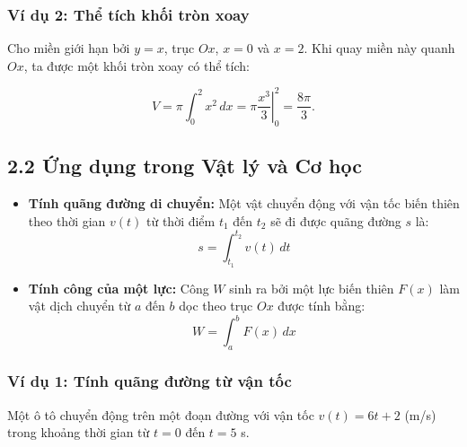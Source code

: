 \documentclass[12pt,a4paper]{article}
\begin{document}
\subsubsection*{Ví dụ 2: Thể tích khối tròn xoay}
Cho miền giới hạn bởi $y=x$, trục $Ox$, $x=0$ và $x=2$. Khi quay miền này quanh $Ox$, ta được một khối tròn xoay có thể tích:

\begin{center}
\end{center}
\[
V=\pi\int_0^2x^2\,dx
=\pi\left.\frac{x^3}{3}\right|_0^2
=\frac{8\pi}{3}.
\]

\subsection{2.2 Ứng dụng trong Vật lý và Cơ học}
\begin{itemize}
    \item \textbf{Tính quãng đường di chuyển:} Một vật chuyển động với vận tốc biến thiên theo thời gian $v(t)$ từ thời điểm $t_1$ đến $t_2$ sẽ đi được quãng đường $s$ là:
    \begin{equation}
    s = \int_{t_1}^{t_2} v(t) \, dt
    \end{equation}
    \item \textbf{Tính công của một lực:} Công $W$ sinh ra bởi một lực biến thiên $F(x)$ làm vật dịch chuyển từ $a$ đến $b$ dọc theo trục $Ox$ được tính bằng:
    \begin{equation}
    W = \int_{a}^{b} F(x) \, dx
    \end{equation}
\end{itemize}

\subsubsection*{Ví dụ 1: Tính quãng đường từ vận tốc}
Một ô tô chuyển động trên một đoạn đường với vận tốc
$v(t)=6t+2$ (m/s) trong khoảng thời gian từ $t=0$ đến $t=5$ s.
\end{document}
